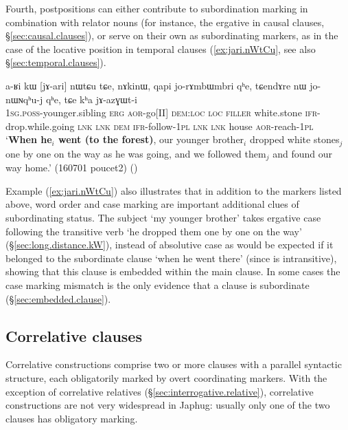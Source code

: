Fourth, postpositions can either contribute to subordination marking in combination with relator nouns (for instance, the ergative in causal clauses, §\ref{sec:causal.clauses}), or serve on their own as subordinating markers, as in the case of the locative position in temporal clauses (\ref{ex:jari.nWtCu}, see also §\ref{sec:temporal.clauses}).

 \begin{exe}
\ex \label{ex:jari.nWtCu}
\gll a-ʁi kɯ [jɤ-ari] nɯtɕu tɕe, nɤkinɯ, qapi jo-rɤmbɯmbri qʰe, tɕendɤre nɯ jo-nɯɴqʰu-j qʰe, tɕe kʰa jɤ-azɣɯt-i \\
\textsc{1sg}.\textsc{poss}-younger.sibling \textsc{erg} \textsc{aor}-go[II] \textsc{dem}:\textsc{loc} \textsc{loc} \textsc{filler} white.stone \textsc{ifr}-drop.while.going \textsc{lnk} \textsc{lnk} \textsc{dem} \textsc{ifr}-follow-\textsc{1pl} \textsc{lnk} \textsc{lnk} house \textsc{aor}-reach-\textsc{1pl} \\
\glt `\textbf{When he$_i$ went (to the forest)}, our younger brother$_i$ dropped white stones$_j$ one by one on the way as he was going, and we followed them$_j$ and found our way home.' (160701 poucet2)
()
\end{exe}

Example (\ref{ex:jari.nWtCu}) also illustrates that in addition to the markers listed above, word order and case marking are important additional clues of subordinating status. The subject  `my younger brother' takes ergative case following the transitive verb  `he dropped them one by one on the way' (§\ref{sec:long.distance.kW}), instead of absolutive case as would be expected if it belonged to the subordinate clause  `when he went there' (since  is intransitive), showing that this clause is embedded within the main clause. In some cases the case marking mismatch is the only evidence that a clause is subordinate (§\ref{sec:embedded.clause}).

\subsection{Correlative clauses}  \label{sec:correlative.clauses}
Correlative constructions comprise two or more clauses with a parallel syntactic structure, each obligatorily marked by overt coordinating markers. With the exception of correlative relatives (§\ref{sec:interrogative.relative}), correlative constructions are not very widespread in Japhug: usually only one of the two clauses has obligatory marking.

